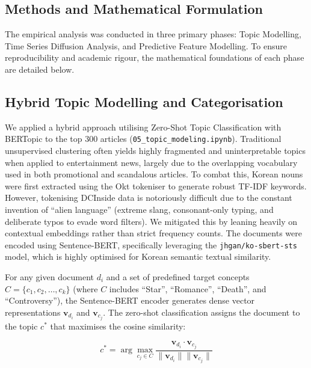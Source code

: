 \documentclass[9pt,twoside,lineno]{pnas-new}
\begin{document}
\begin{article}
\section*{Methods and Mathematical Formulation}
The empirical analysis was conducted in three primary phases: Topic Modelling, Time Series Diffusion Analysis, and Predictive Feature Modelling. To ensure reproducibility and academic rigour, the mathematical foundations of each phase are detailed below.

\subsection*{Hybrid Topic Modelling and Categorisation}
We applied a hybrid approach utilising Zero-Shot Topic Classification with BERTopic \cite{grootendorst2022bertopic} to the top 300 articles (\texttt{05\_topic\_modeling.ipynb}). Traditional unsupervised clustering often yields highly fragmented and uninterpretable topics when applied to entertainment news, largely due to the overlapping vocabulary used in both promotional and scandalous articles. To combat this, Korean nouns were first extracted using the Okt tokeniser to generate robust TF-IDF keywords. However, tokenising DCInside data is notoriously difficult due to the constant invention of ``alien language'' (extreme slang, consonant-only typing, and deliberate typos to evade word filters). We mitigated this by leaning heavily on contextual embeddings rather than strict frequency counts. The documents were encoded using Sentence-BERT, specifically leveraging the \texttt{jhgan/ko-sbert-sts} model, which is highly optimised for Korean semantic textual similarity.

For any given document $d_i$ and a set of predefined target concepts $C = \{c_1, c_2, \ldots, c_k\}$ (where $C$ includes ``Star'', ``Romance'', ``Death'', and ``Controversy''), the Sentence-BERT encoder generates dense vector representations $\mathbf{v}_{d_i}$ and $\mathbf{v}_{c_j}$. The zero-shot classification assigns the document to the topic $c^*$ that maximises the cosine similarity:

\begin{equation}
c^* = \arg\max_{c_j \in C} \frac{\mathbf{v}_{d_i} \cdot \mathbf{v}_{c_j}}{\|\mathbf{v}_{d_i}\| \|\mathbf{v}_{c_j}\|}
\end{equation}


\end{article}
\end{document}
